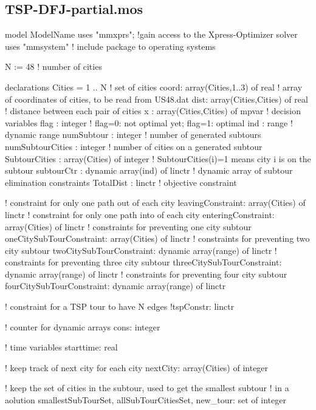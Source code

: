 \documentclass[twoside,12pt]{article}
\begin{document}
\subsection{TSP-DFJ-partial.mos}
\begin{verbatim*}
model ModelName
uses "mmxprs"; !gain access to the Xpress-Optimizer solver
uses "mmsystem" ! include package to operating systems

N := 48  ! number of cities

declarations
	Cities = 1 .. N                         	! set of cities
	coord: array(Cities,1..3) of real			! array of coordinates of cities, to be read from US48.dat
	dist: array(Cities,Cities) of real  		! distance between each pair of cities
	x : array(Cities,Cities) of mpvar       	! decision variables
	flag : integer                          	! flag=0: not optimal yet; flag=1: optimal 
	ind : range                             	! dynamic range
	numSubtour : integer                    	! number of generated subtours
	numSubtourCities : integer					! number of cities on a generated subtour
	SubtourCities : array(Cities) of integer	! SubtourCities(i)=1 means city i is on the subtour 
	subtourCtr : dynamic array(ind) of linctr   ! dynamic array of subtour elimination constraints
	TotalDist : linctr    						! objective constraint
	
	! constraint for only one path out of each city
	leavingConstraint: array(Cities)  of linctr      
	! constraint for only one path into of each city
	enteringConstraint: array(Cities)  of linctr     
	! constraints for preventing one city subtour
	oneCitySubTourConstraint: array(Cities)  of linctr     
	! constraints for preventing two city subtour
	twoCitySubTourConstraint: dynamic array(range)  of linctr     
	! constraints for preventing three city subtour
	threeCitySubTourConstraint: dynamic array(range)  of linctr  
	! constraints for preventing four city subtour
	fourCitySubTourConstraint: dynamic array(range)  of linctr  
	
	! constraint for a TSP tour to have N edges
	!tspConstr: linctr
	
	! counter for dynamic arrays
	cons: integer          
	
	! time variables
	starttime: real
	 
	! keep track of next city for each city
	nextCity: array(Cities) of integer
	
	! keep the set of cities in the subtour, used to get the smallest subtour
	! in a aolution
	smallestSubTourSet, allSubTourCitiesSet, new_tour: set of integer
	

\end{verbatim*}
\end{document}
